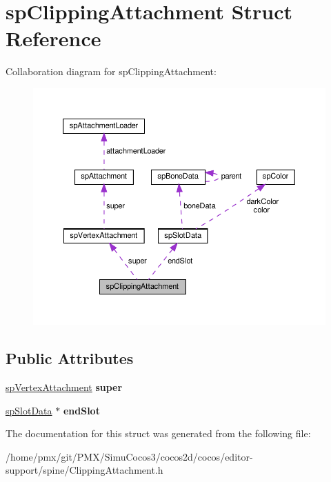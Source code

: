 \hypertarget{structspClippingAttachment}{}\section{sp\+Clipping\+Attachment Struct Reference}
\label{structspClippingAttachment}


Collaboration diagram for sp\+Clipping\+Attachment\+:
\nopagebreak
\begin{figure}[H]
\begin{center}
\leavevmode
\includegraphics[width=350pt]{structspClippingAttachment__coll__graph}
\end{center}
\end{figure}
\subsection*{Public Attributes}
\begin{DoxyCompactItemize}
\item 
\mbox{\label{structspClippingAttachment_a517a05e08085529a2adf56018b053f65}} 
\hyperlink{structspVertexAttachment}{sp\+Vertex\+Attachment} {\bfseries super}
\item 
\mbox{\label{structspClippingAttachment_ac805e1093c32593c3d38cd7b38867399}} 
\hyperlink{structspSlotData}{sp\+Slot\+Data} $\ast$ {\bfseries end\+Slot}
\end{DoxyCompactItemize}


The documentation for this struct was generated from the following file\+:\begin{DoxyCompactItemize}
\item 
/home/pmx/git/\+P\+M\+X/\+Simu\+Cocos3/cocos2d/cocos/editor-\/support/spine/Clipping\+Attachment.\+h\end{DoxyCompactItemize}

